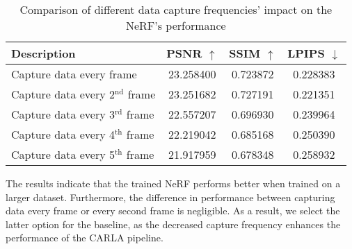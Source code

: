 \begin{table}[ht]
\centering
\setlength{\tabcolsep}{6pt}
\renewcommand{\arraystretch}{1.5}
\begin{tabular}{l | C{2.2} C{1.3} C{1.3}}
\hline
\textbf{Description} & \textbf{PSNR $\uparrow$} & \textbf{SSIM $\uparrow$} & \textbf{LPIPS $\downarrow$} \\
\hline
Capture data every frame &  23.258400 & 0.723872 & 0.228383 \\
Capture data every 2$^{\text{nd}}$ frame & 23.251682 &  0.727191 &  0.221351 \\
Capture data every 3$^{\text{rd}}$ frame & 22.557207 & 0.696930 & 0.239964 \\
Capture data every 4$^{\text{th}}$ frame & 22.219042 & 0.685168 & 0.250390 \\
Capture data every 5$^{\text{th}}$ frame &  21.917959 &  0.678348 &  0.258932 \\
\hline
\end{tabular}
\caption[Results for experiment 1.3: Number of frames]{Comparison of different data capture frequencies' impact on the NeRF's performance}
\label{tab:exp_frames-2}
\end{table}

\begin{comment}
\vspace{0.5cm}

\setlength{\tabcolsep}{12pt}
\renewcommand{\arraystretch}{1.2}
\begin{tabular}{l l}
\multicolumn{2}{c}{\textbf{Experiment setup - constant variables}} \\
\hline
Parameter & Value \\
\hline
\cellcolor{blue}Camera setup &\cellcolor{blue}Two cameras, $[-10^{\circ}, 10^{\circ}]$ yaw \\
\cellcolor{blue}Distance &\cellcolor{blue}4 turns \\
Image resolution &  $600 \times 450$ \\
Speed & 100\% (default: 30km/h) \\
\hline
\end{tabular}
\caption[Constant parameters for experiment 1.3.]{Overview of the values of the parameters that remained constant across the experiments' runs.}
\label{tab:exp-number-of-frames-stable-variables}
\end{comment}

The results indicate that the trained NeRF performs better when trained on a larger dataset. Furthermore, the difference in performance between capturing data every frame or every second frame is negligible. As a result, we select the latter option for the baseline, as the decreased capture frequency enhances the performance of the CARLA pipeline.

